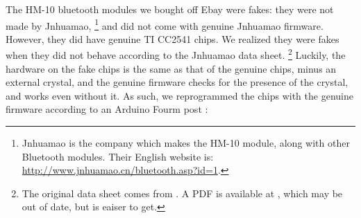 \documentclass[]{article}
\begin{document}
The HM-10 bluetooth modules we bought off Ebay were fakes: they were not made by Jnhuamao,
\footnote{Jnhuamao is the company which makes the HM-10 module, along with other Bluetooth modules. Their English website is: \url{http://www.jnhuamao.cn/bluetooth.asp?id=1}.}
and did not come with genuine Jnhuamao firmware.
However, they did have genuine TI CC2541 chips.
We realized they were fakes when they did not behave according to
the Jnhuamao data sheet.
\footnote{The original data sheet comes from \cite{jnhuamaodatasheet}.
A PDF is available at \cite{jnhuamaomit}, which may be out of date, but is eaiser to get.}
Luckily, the hardware on the fake chips is the same as that of the genuine chips, minus an external crystal, and the genuine firmware checks for the presence of the crystal, and works even without
it. \cite{crystal}
As such, we reprogrammed the chips with the genuine firmware according
to an Arduino Fourm post \cite{crystal}:
\end{document}
